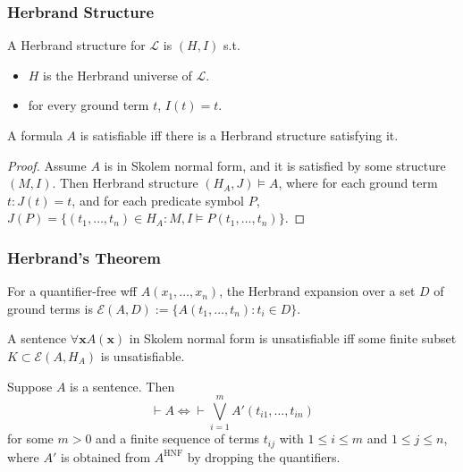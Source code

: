 \documentclass[UTF8,aspectratio=43,11pt,colorlinks,compress,openany]{beamer}%
\begin{document}
\begin{frame}\frametitle{Herbrand Structure}
\begin{definition}
A Herbrand structure for $\mathscr{L}$ is $(H,I)$ s.t.
\begin{itemize}
	\item $H$ is the Herbrand universe of $\mathscr{L}$.
	\item for every ground term $t$, $I(t)=t$.
\end{itemize}
\end{definition}
\begin{theorem}
A formula $A$ is satisfiable iff there is a Herbrand structure satisfying it.
\end{theorem}
\begin{proof}
Assume $A$ is in Skolem normal form, and it is satisfied by some structure $(M,I)$. Then Herbrand structure $(H_A,J)\vDash A$, where for each ground term $t: J(t)=t$, and for each predicate symbol $P$, $J(P)=\big\{(t_1,\dots,t_n)\in H_A: M,I\vDash P(t_1,\dots,t_n)\big\}$.
\end{proof}
\end{frame}

\begin{frame}\frametitle{Herbrand's Theorem}
For a quantifier-free wff $A(x_1,\dots,x_n)$, the Herbrand expansion over a set $D$ of ground terms is $\mathcal{E}(A,D):=\big\{A(t_1,\dots,t_n): t_i\in D\big\}$.
\begin{theorem}
A sentence $\forall\mathbf{x} A(\mathbf{x})$ in Skolem normal form is unsatisfiable iff some finite subset $K\subset\mathcal{E}(A,H_A)$ is unsatisfiable.
\end{theorem}
	\begin{theorem}
		Suppose $A$ is a sentence. Then
		\[\vdash A\iff\vdash\bigvee\limits_{i=1}^m A'(t_{i1},\dots,t_{in})\]
		for some $m>0$ and a finite sequence of terms $t_{ij}$ with $1\leq i\leq m$ and $1\leq j\leq n$, where $A'$ is obtained from $A^{\mathrm{HNF}}$ by dropping the quantifiers.
	\end{theorem}
\end{frame}
\end{document}
